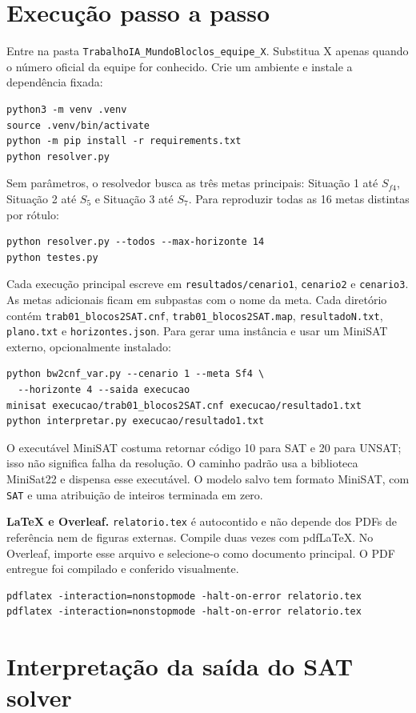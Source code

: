 \documentclass[11pt,a4paper]{article}
\begin{document}
\section{Execução passo a passo}
Entre na pasta \texttt{TrabalhoIA\_MundoBloclos\_equipe\_X}. Substitua X apenas quando o número oficial da equipe for conhecido. Crie um ambiente e instale a dependência fixada:
\begin{lstlisting}
python3 -m venv .venv
source .venv/bin/activate
python -m pip install -r requirements.txt
python resolver.py
\end{lstlisting}
Sem parâmetros, o resolvedor busca as três metas principais: Situação 1 até $S_{f4}$, Situação 2 até $S_5$ e Situação 3 até $S_7$. Para reproduzir todas as 16 metas distintas por rótulo:
\begin{lstlisting}
python resolver.py --todos --max-horizonte 14
python testes.py
\end{lstlisting}
Cada execução principal escreve em \texttt{resultados/cenario1}, \texttt{cenario2} e \texttt{cenario3}. As metas adicionais ficam em subpastas com o nome da meta. Cada diretório contém \texttt{trab01\_blocos2SAT.cnf}, \texttt{trab01\_blocos2SAT.map}, \texttt{resultadoN.txt}, \texttt{plano.txt} e \texttt{horizontes.json}. Para gerar uma instância e usar um MiniSAT externo, opcionalmente instalado:
\begin{lstlisting}
python bw2cnf_var.py --cenario 1 --meta Sf4 \
  --horizonte 4 --saida execucao
minisat execucao/trab01_blocos2SAT.cnf execucao/resultado1.txt
python interpretar.py execucao/resultado1.txt
\end{lstlisting}
O executável MiniSAT costuma retornar código 10 para SAT e 20 para UNSAT; isso não significa falha da resolução. O caminho padrão usa a biblioteca MiniSat22 e dispensa esse executável. O modelo salvo tem formato MiniSAT, com \texttt{SAT} e uma atribuição de inteiros terminada em zero.

\textbf{LaTeX e Overleaf.} \texttt{relatorio.tex} é autocontido e não depende dos PDFs de referência nem de figuras externas. Compile duas vezes com pdfLaTeX. No Overleaf, importe esse arquivo e selecione-o como documento principal. O PDF entregue foi compilado e conferido visualmente.
\begin{lstlisting}
pdflatex -interaction=nonstopmode -halt-on-error relatorio.tex
pdflatex -interaction=nonstopmode -halt-on-error relatorio.tex
\end{lstlisting}

\section{Interpretação da saída do SAT solver}
\end{document}
